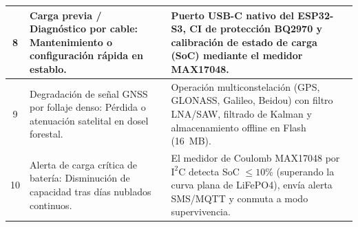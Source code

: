 \begin{table}[H]
\begin{tabularx}{\linewidth}{|c|X|X|}
        8 & Carga previa / Diagnóstico por cable: Mantenimiento o configuración rápida en establo. & Puerto USB-C nativo del ESP32-S3, CI de protección BQ2970 y calibración de estado de carga (SoC) mediante el medidor MAX17048. \\ \hline
        9 & Degradación de señal GNSS por follaje denso: Pérdida o atenuación satelital en dosel forestal. & Operación multiconstelación (GPS, GLONASS, Galileo, Beidou) con filtro LNA/SAW, filtrado de Kalman y almacenamiento offline en Flash (16~MB). \\ \hline
        10 & Alerta de carga crítica de batería: Disminución de capacidad tras días nublados continuos. & El medidor de Coulomb MAX17048 por $\text{I}^2\text{C}$ detecta SoC $\le 10\%$ (superando la curva plana de LiFePO4), envía alerta SMS/MQTT y conmuta a modo supervivencia. \\ \hline
    \end{tabularx}
\end{table}